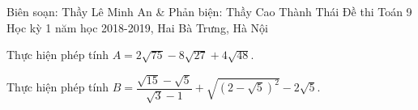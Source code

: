 \begin{name}
{\newline Biên soạn: Thầy Lê Minh An \& Phản biện: Thầy Cao Thành Thái}
{Đề thi Toán 9 Học kỳ 1 năm học 2018-2019, Hai Bà Trưng, Hà Nội }
\end{name}
\setcounter{bt}{0}
\begin{bt}%
	Thực hiện phép tính $A=2\sqrt{75}-8\sqrt{27}+4\sqrt{48}$.
\end{bt}

\begin{bt}%
	Thực hiện phép tính $B=\dfrac{\sqrt{15}-\sqrt{5}}{\sqrt{3}-1}+\sqrt{(2-\sqrt{5})^2}-2 \sqrt{5}$.
\end{bt}


